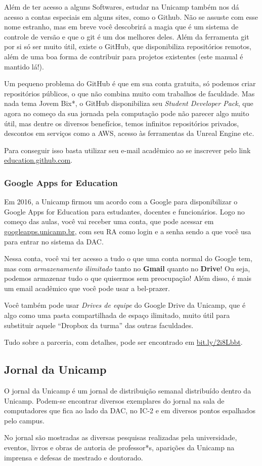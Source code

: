 Além de ter acesso a alguns Softwares, estudar na Unicamp também nos dá acesso
a contas especiais em alguns sites, como o Github. Não se assuste com esse nome
estranho, mas em breve você descobrirá a magia que é um sistema de controle de
versão e que o git é um dos melhores deles. Além da ferramenta git por si só
ser muito útil, existe o GitHub, que disponibiliza repositórios remotos, além
de uma boa forma de contribuir para projetos existentes (este manual é mantido
lá!).

Um pequeno problema do GitHub é que em sua conta gratuita, só podemos criar
repositórios públicos, o que não combina muito com trabalhos de faculdade. Mas
nada tema Jovem Bix*, o GitHub disponibiliza seu \emph{Student Developer Pack},
que agora no começo da sua jornada pela computação pode não parecer algo muito
útil, mas dentre os diversos benefícios, temos infinitos repositórios privados,
descontos em serviços como a AWS, acesso às ferramentas da Unreal Engine etc.

Para conseguir isso basta utilizar seu e-mail acadêmico ao se inscrever pelo
link \url{education.github.com}.

\subsubsection{Google Apps for Education}

Em 2016, a Unicamp firmou um acordo com a Google para disponibilizar o
Google Apps for Education para estudantes, docentes e funcionários. Logo no
começo das aulas, você vai receber uma conta, que pode acessar em
\url{googleapps.unicamp.br}, com seu RA como login e a senha sendo a que você
usa para entrar no sistema da DAC.

Nessa conta, você vai ter acesso a tudo o que uma conta normal do Google tem,
mas com \emph{armazenamento ilimitado} tanto no \textbf{Gmail} quanto no
\textbf{Drive}! Ou seja, podemos armazenar tudo o que quisermos sem
preocupação! Além disso, é mais um email acadêmico que você pode usar a
bel-prazer.

Você também pode usar \emph{Drives de equipe} do Google Drive da Unicamp, que é
algo como uma pasta compartilhada de espaço ilimitado, muito útil para
substituir aquele ``Dropbox da turma'' das outras faculdades.

Tudo sobre a parceria, com detalhes, pode ser encontrado em
\url{bit.ly/2i8Lbbt}.

\subsection{Jornal da Unicamp}

O jornal da Unicamp é um jornal de distribuição semanal distribuído dentro da
Unicamp. Podem-se encontrar diversos exemplares do jornal na sala de
computadores que fica ao lado da DAC, no IC-2 e em diversos pontos espalhados
pelo campus.

No jornal são mostradas as diversas pesquisas realizadas pela universidade,
eventos, livros e obras de autoria de professor*s, aparições da Unicamp na
imprensa e defesas de mestrado e doutorado.
